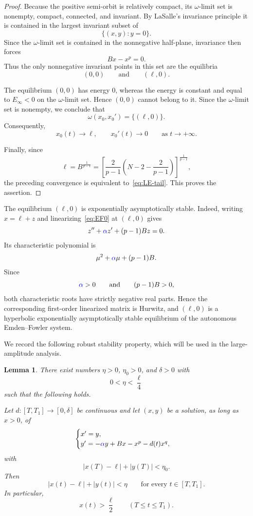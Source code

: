 \documentclass[11pt]{article}
\newcommand{\add}[1]{{\color{blue}#1}}
\newcommand{\oldrev}[1]{#1}
\newcommand{\damp}{\add{\alpha}}            %
\newtheorem{lemma}[theorem]{Lemma}
\theoremstyle{definition}
\begin{document}
\begin{proof}
Because the positive semi-orbit is \oldrev{relatively compact},
its $\omega$-limit set is nonempty, compact, connected, and invariant.
By LaSalle's invariance principle it is contained in the largest
invariant subset of
\[
\{(x,y):y=0\}.
\]
\oldrev{Since the $\omega$-limit set is contained in the
nonnegative half-plane,} invariance then forces
\[
Bx-x^p=0.
\]
Thus the only nonnegative invariant points in this set are the
equilibria
\[
(0,0)
\qquad\text{and}\qquad
(\ell,0).
\]

The equilibrium $(0,0)$ has energy $0$, whereas the energy is constant
and equal to $E_\infty<0$ on the $\omega$-limit set. Hence $(0,0)$
cannot belong to it. Since the $\omega$-limit set is nonempty, we
conclude that
\[
\omega(x_0,x_0')=\{(\ell,0)\}.
\]
Consequently,
\[
x_0(t)\longrightarrow\ell,
\qquad
x_0'(t)\longrightarrow0
\qquad
\text{as }t\to+\infty.
\]

\oldrev{Finally, since
\[
\ell=B^{\frac1{p-1}}
=
\left[
\frac2{p-1}
\left(
N-2-\frac2{p-1}
\right)
\right]^{\frac1{p-1}},
\]
the preceding convergence is equivalent to~\eqref{eq:LE-tail}.}
This proves the assertion.
\end{proof}

The equilibrium $(\ell,0)$ is exponentially asymptotically stable.
Indeed, writing $x=\ell+z$ and linearizing~\eqref{eq:EF0} at
$(\ell,0)$ gives
\[
z''
+\damp z'
+(p-1)Bz
=0.
\]
Its characteristic polynomial is
\[
\mu^2+\damp\mu+(p-1)B.
\]
Since
\[
\damp>0
\qquad\text{and}\qquad
(p-1)B>0,
\]
both characteristic roots have strictly negative real parts.
\oldrev{Hence the corresponding first-order linearized matrix
is Hurwitz, and $(\ell,0)$ is a hyperbolic exponentially
asymptotically stable equilibrium of the autonomous
Emden--Fowler system.}

We record the following robust stability property, which will be
used in the large-amplitude analysis.

\begin{lemma}
\label{lem:robust}
There exist numbers $\eta>0$, $\eta_0>0$, and $\delta>0$ with
\[
0<\eta<\frac{\ell}{4}
\]
such that the following holds.

Let $d:[T,T_1]\to[0,\delta]$ be continuous and let $(x,y)$ be a
solution, as long as $x>0$, of
\begin{equation}
\label{eq:perturbed-system}
\begin{cases}
x'=y,\\
y'=-\damp y+Bx-x^p-d(t)x^q,
\end{cases}
\end{equation}
with
\[
|x(T)-\ell|+|y(T)|<\eta_0.
\]
Then
\[
|x(t)-\ell|+|y(t)|<\eta
\qquad
\text{for every }t\in[T,T_1].
\]
In particular,
\[
x(t)>\frac{\ell}{2}
\qquad
(T\leq t\leq T_1).
\]
\end{lemma}
\end{document}

